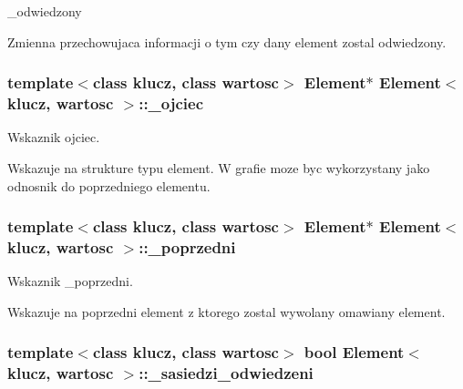 \+\_\+odwiedzony 

Zmienna przechowujaca informacji o tym czy dany element zostal odwiedzony. \hypertarget{class_element_a92a5ea21225b0bf182f44f73594ab6b4}{
\subsubsection[{\+\_\+ojciec}]{\setlength{\rightskip}{0pt plus 5cm}template$<$class klucz, class wartosc$>$ {\bf Element}$\ast$ {\bf Element}$<$ klucz, wartosc $>$\+::\+\_\+ojciec\hspace{0.3cm}{\ttfamily [private]}}}\label{class_element_a92a5ea21225b0bf182f44f73594ab6b4}


Wskaznik ojciec. 

Wskazuje na strukture typu element. W grafie moze byc wykorzystany jako odnosnik do poprzedniego elementu. \hypertarget{class_element_a975e5d979354707594298802b66c40a9}{
\subsubsection[{\+\_\+poprzedni}]{\setlength{\rightskip}{0pt plus 5cm}template$<$class klucz, class wartosc$>$ {\bf Element}$\ast$ {\bf Element}$<$ klucz, wartosc $>$\+::\+\_\+poprzedni\hspace{0.3cm}{\ttfamily [private]}}}\label{class_element_a975e5d979354707594298802b66c40a9}


Wskaznik \+\_\+poprzedni. 

Wskazuje na poprzedni element z ktorego zostal wywolany omawiany element. \hypertarget{class_element_ac615eb72456973cc328febd494ebfa5f}{
\subsubsection[{\+\_\+sasiedzi\+\_\+odwiedzeni}]{\setlength{\rightskip}{0pt plus 5cm}template$<$class klucz, class wartosc$>$ bool {\bf Element}$<$ klucz, wartosc $>$\+::\+\_\+sasiedzi\+\_\+odwiedzeni\hspace{0.3cm}{\ttfamily [private]}}}\label{class_element_ac615eb72456973cc328febd494ebfa5f}


